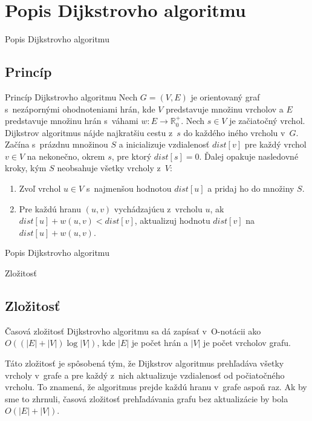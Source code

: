 \documentclass[15pt]{beamer}
\begin{document}
\section{Popis Dijkstrovho algoritmu}
\begin{frame}{Popis Dijkstrovho algoritmu}
	\subsection{Princíp}
	\begin{block}{Princíp Dijkstrovho algoritmu}
		Nech $G=(V,E)$ je orientovaný graf s~nezápornými ohodnoteniami hrán, kde $V$ predstavuje množinu vrcholov a $E$ predstavuje množinu hrán s~váhami $w: E \rightarrow \mathbb{R}^+_0$. Nech $s \in V$ je začiatočný vrchol. Dijkstrov algoritmus nájde najkratšiu cestu z~$s$ do každého iného vrcholu v~$G$. Začína s~prázdnu množinou $S$ a inicializuje vzdialenosť $dist[v]$ pre každý vrchol $v \in V$ na nekonečno, okrem $s$, pre ktorý $dist[s]=0$. Ďalej opakuje nasledovné kroky, kým $S$ neobsahuje všetky vrcholy z~$V$:
		\begin{enumerate}
			\item Zvoľ vrchol $u \in V$ s~najmenšou hodnotou $dist[u]$ a pridaj ho do množiny $S$.
			\item Pre každú hranu $(u,v)$ vychádzajúcu z~vrcholu $u$, ak $dist[u] + w(u,v) < dist[v]$, aktualizuj hodnotu $dist[v]$ na $dist[u] + w(u,v)$.
			      			      			      			      
		\end{enumerate}
	\end{block}
\end{frame}

\begin{frame}{Popis Dijkstrovho algoritmu}
	\begin{block}{Zložitosť}
		\subsection{Zložitosť}
		Časová zložitosť Dijkstrovho algoritmu sa dá zapísať v~O-notácii ako $O((|E|+|V|)\log |V|)$, kde $|E|$ je počet hrán a $|V|$ je počet vrcholov grafu.
						
		Táto zložitosť je spôsobená tým, že Dijkstrov algoritmus prehľadáva všetky vrcholy v~grafe a pre každý z~nich aktualizuje vzdialenosť od počiatočného vrcholu. To znamená, že algoritmus prejde každú hranu v~grafe aspoň raz. Ak by sme to zhrnuli, časová zložitosť prehľadávania grafu bez aktualizácie by bola $O(|E|+|V|)$.
	\end{block}
\end{frame}
\end{document}
